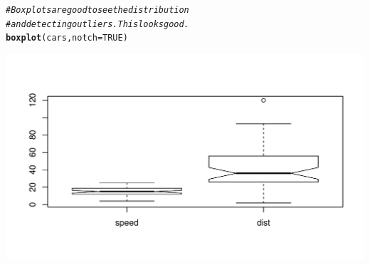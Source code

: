 \documentclass{article}\usepackage[]{graphicx}\usepackage[]{color}
\makeatletter
\def\maxwidth{ %
  \ifdim\Gin@nat@width>\linewidth
    \linewidth
  \else
    \Gin@nat@width
  \fi
}
\newcommand{\hlnum}[1]{\textcolor[rgb]{0.686,0.059,0.569}{#1}}%
\newcommand{\hlcom}[1]{\textcolor[rgb]{0.678,0.584,0.686}{\textit{#1}}}%
\newcommand{\hlstd}[1]{\textcolor[rgb]{0.345,0.345,0.345}{#1}}%
\newcommand{\hlkwc}[1]{\textcolor[rgb]{0.333,0.667,0.333}{#1}}%
\newcommand{\hlkwd}[1]{\textcolor[rgb]{0.737,0.353,0.396}{\textbf{#1}}}%
\newenvironment{kframe}{%
 \def\at@end@of@kframe{}%
 \ifinner\ifhmode%
  \def\at@end@of@kframe{\end{minipage}}%
  \begin{minipage}{\columnwidth}%
 \fi\fi%
 \def\FrameCommand##1{\hskip\@totalleftmargin \hskip-\fboxsep
 \colorbox{shadecolor}{##1}\hskip-\fboxsep
     \hskip-\linewidth \hskip-\@totalleftmargin \hskip\columnwidth}%
 \MakeFramed {\advance\hsize-\width
   \@totalleftmargin\z@ \linewidth\hsize
   \@setminipage}}%
 {\par\unskip\endMakeFramed%
 \at@end@of@kframe}
\newenvironment{knitrout}{}{} %
\makeatother
\begin{document}
\begin{knitrout}
\color{fgcolor}\begin{kframe}
\begin{alltt}
    \hlcom{# Boxplots are good to see the distribution}
    \hlcom{# and detecting outliers. This looks good.}
    \hlkwd{boxplot}\hlstd{(cars,} \hlkwc{notch}\hlstd{=}\hlnum{TRUE}\hlstd{)}
\end{alltt}
\end{kframe}
\includegraphics[width=\maxwidth]{figure/cars-boxplot-1} 

\end{knitrout}
  
\end{document}
